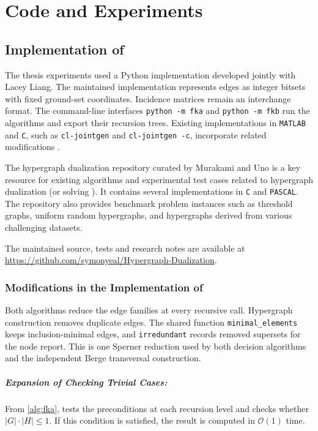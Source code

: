 \chapter{Code and Experiments}

\section{Implementation of \FKA}

The thesis experiments used a Python implementation developed jointly with Lacey
Liang. The maintained implementation represents edges as integer bitsets with
fixed ground-set coordinates. Incidence matrices remain an interchange format.
The command-line interfaces \texttt{python -m fka} and \texttt{python -m fkb}
run the algorithms and export their recursion trees. Existing implementations in
\texttt{MATLAB} and \texttt{C}, such as \texttt{cl-jointgen} and
\texttt{cl-jointgen -c}, incorporate related modifications \cite{HKS08}.

The hypergraph dualization repository curated by Murakami and Uno \cite{Uno24} is a key resource for existing algorithms and experimental test cases related to hypergraph dualization (or solving \TransHyp). It contains several implementations in \texttt{C} and \texttt{PASCAL}. The repository also provides benchmark problem instances such as threshold graphs, uniform random hypergraphs, and hypergraphs derived from various challenging datasets.

The maintained source, tests and research notes are available at \url{https://github.com/symonyeal/Hypergraph-Dualization}.

\subsection{Modifications in the Implementation of \FKA}

Both algorithms reduce the edge families at every recursive call. Hypergraph
construction removes duplicate edges. The shared function \texttt{minimal\_elements}
keeps inclusion-minimal edges, and \texttt{irredundant} records removed supersets
for the node report. This is one Sperner reduction used by both decision algorithms
and the independent Berge transversal construction.

\paragraph{Expansion of Checking Trivial Cases:} From \ref{alg:fka}, \FKA{} tests the preconditions at each recursion level and checks whether $|G|\cdot|H|\leq 1$. If this condition is satisfied, the result is computed in $\mathcal{O}(1)$ time.

